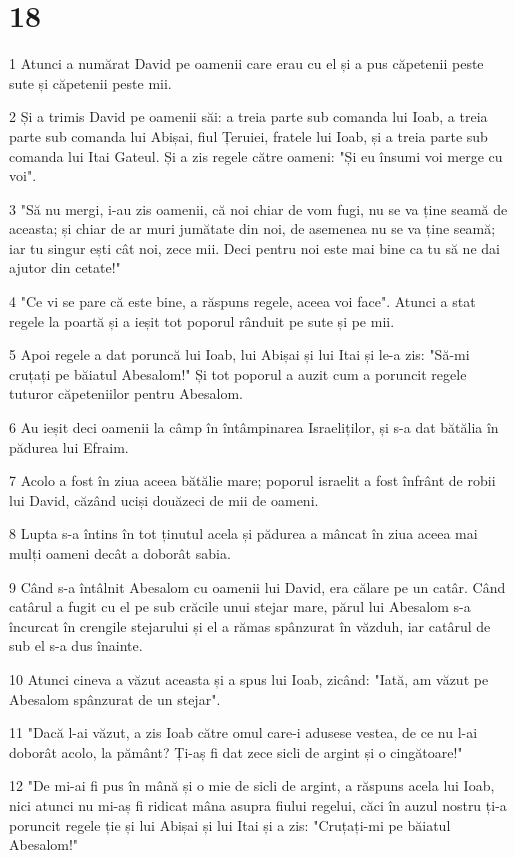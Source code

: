 \chapter{18}

\par 1 Atunci a numărat David pe oamenii care erau cu el și a pus căpetenii peste sute și căpetenii peste mii.
\par 2 Și a trimis David pe oamenii săi: a treia parte sub comanda lui Ioab, a treia parte sub comanda lui Abișai, fiul Țeruiei, fratele lui Ioab, și a treia parte sub comanda lui Itai Gateul. Și a zis regele către oameni: "Și eu însumi voi merge cu voi".
\par 3 "Să nu mergi, i-au zis oamenii, că noi chiar de vom fugi, nu se va ține seamă de aceasta; și chiar de ar muri jumătate din noi, de asemenea nu se va ține seamă; iar tu singur ești cât noi, zece mii. Deci pentru noi este mai bine ca tu să ne dai ajutor din cetate!"
\par 4 "Ce vi se pare că este bine, a răspuns regele, aceea voi face". Atunci a stat regele la poartă și a ieșit tot poporul rânduit pe sute și pe mii.
\par 5 Apoi regele a dat poruncă lui Ioab, lui Abișai și lui Itai și le-a zis: "Să-mi cruțați pe băiatul Abesalom!" Și tot poporul a auzit cum a poruncit regele tuturor căpeteniilor pentru Abesalom.
\par 6 Au ieșit deci oamenii la câmp în întâmpinarea Israeliților, și s-a dat bătălia în pădurea lui Efraim.
\par 7 Acolo a fost în ziua aceea bătălie mare; poporul israelit a fost înfrânt de robii lui David, căzând uciși douăzeci de mii de oameni.
\par 8 Lupta s-a întins în tot ținutul acela și pădurea a mâncat în ziua aceea mai mulți oameni decât a doborât sabia.
\par 9 Când s-a întâlnit Abesalom cu oamenii lui David, era călare pe un catâr. Când catârul a fugit cu el pe sub crăcile unui stejar mare, părul lui Abesalom s-a încurcat în crengile stejarului și el a rămas spânzurat în văzduh, iar catârul de sub el s-a dus înainte.
\par 10 Atunci cineva a văzut aceasta și a spus lui Ioab, zicând: "Iată, am văzut pe Abesalom spânzurat de un stejar".
\par 11 "Dacă l-ai văzut, a zis Ioab către omul care-i adusese vestea, de ce nu l-ai doborât acolo, la pământ? Ți-aș fi dat zece sicli de argint și o cingătoare!"
\par 12 "De mi-ai fi pus în mână și o mie de sicli de argint, a răspuns acela lui Ioab, nici atunci nu mi-aș fi ridicat mâna asupra fiului regelui, căci în auzul nostru ți-a poruncit regele ție și lui Abișai și lui Itai și a zis: "Cruțați-mi pe băiatul Abesalom!"
